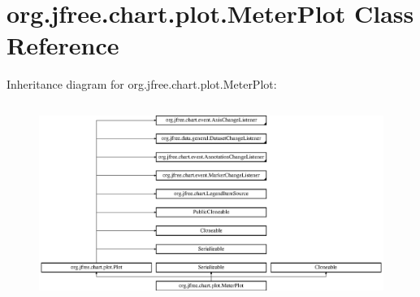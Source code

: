 \hypertarget{classorg_1_1jfree_1_1chart_1_1plot_1_1_meter_plot}{}\section{org.\+jfree.\+chart.\+plot.\+Meter\+Plot Class Reference}
\label{classorg_1_1jfree_1_1chart_1_1plot_1_1_meter_plot}
Inheritance diagram for org.\+jfree.\+chart.\+plot.\+Meter\+Plot\+:\begin{figure}[H]
\begin{center}
\leavevmode
\includegraphics[height=6.436782cm]{classorg_1_1jfree_1_1chart_1_1plot_1_1_meter_plot}
\end{center}
\end{figure}
